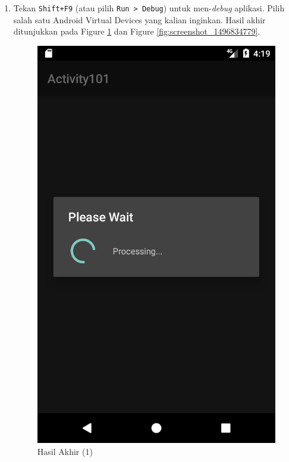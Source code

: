 \documentclass{scrartcl}
\begin{document}
\begin{enumerate}
\begin{verbatim}
	\end{verbatim}
	
	\item Tekan \texttt{Shift+F9} (atau pilih \texttt{Run > Debug}) untuk men-\textit{debug} aplikasi. Pilih salah satu Android Virtual Devices yang kalian inginkan. Hasil akhir ditunjukkan pada Figure \ref{fig:screenshot_1496827169} dan Figure \ref{fig:screenshot_1496834779}.
	
	\begin{figure}[htbp]
	\begin{minipage}{.5\textwidth}
		\centering
		\includegraphics[width=0.7\linewidth]{Screenshot_1496827169}
		\caption{Hasil Akhir (1)}
		\label{fig:screenshot_1496827169}
	\end{minipage}
	\begin{minipage}{.5\textwidth}
		\centering

\end{minipage}
\end{figure}
\end{enumerate}
\end{document}
